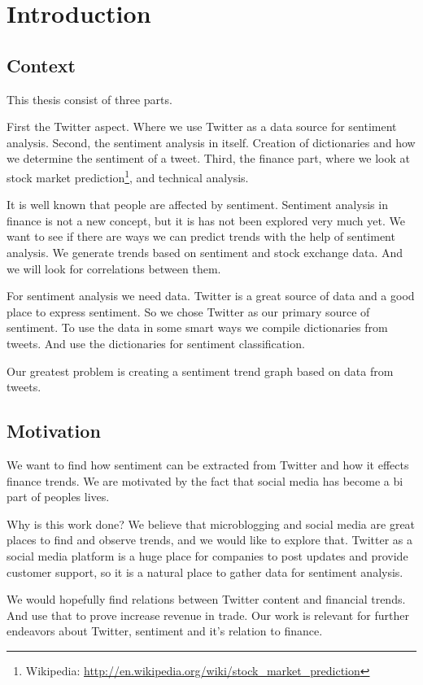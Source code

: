 \chapter{Introduction}\label{introduction}

\section{Context}
This thesis consist of three parts. 

First the Twitter aspect. Where we use Twitter as a data source for sentiment
analysis. Second, the sentiment analysis in itself. Creation of dictionaries
and how we determine the sentiment of a tweet. Third, the finance part, where we
look at stock market prediction\footnote{Wikipedia:
\url{http://en.wikipedia.org/wiki/stock_market_prediction}}, and technical
analysis. 

It is well known that people are affected by sentiment. Sentiment analysis in
finance is not a new concept, but it is has not been explored very much yet.
We want to see if there are ways we can predict trends with the help of
sentiment analysis. We generate trends based on sentiment and stock exchange
data. And we will look for correlations between them. 

For sentiment analysis we need data. Twitter is a great source of data and a
good place to express sentiment. So we chose Twitter as our primary source of
sentiment. To use the data in some smart ways we compile dictionaries from
tweets. And use the dictionaries for sentiment classification. 

Our greatest problem is creating a sentiment trend graph based on data from
tweets. 
%

\section{Motivation}
We want to find how sentiment can be extracted from Twitter and
how it effects finance trends. We are motivated by the fact that social media
has become a bi part of peoples lives. 

Why is this work done? We believe that microblogging and social media are great
places to find and observe trends, and we would like to explore that. Twitter as
a social media platform is a huge place for companies to post updates and
provide customer support, so it is a natural place to gather data for sentiment
analysis.

We would hopefully find relations between Twitter content and financial trends.
And use that to prove increase revenue in trade. Our work is relevant for
further endeavors about Twitter, sentiment and it's relation to finance. 

